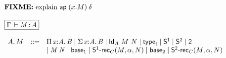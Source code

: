 \begin{small}
\[\begin{array}{l}
\text{\FIXME{explain \apn{}{(x.M)}{\delta}}}

\\ \\

\framebox{\oftp{\Gamma}{M}{A}} \\ \\

\begin{array}{rcl}
A,M & ::= & \picl{x}{A}{B} \mid \sigmacl{x}{A}{B} \mid \idtp{A}{M}{N} \mid
\typ{i} \mid
\dsd{S^1}\mid \dsd{S^2} \mid \dsd{2} \\ 
& & \mid \app M N \mid \base{1} \mid \srec{1}{C}{M}{\alpha}{N} \mid
\base{2} \mid \srec{2}{C}{M}{\alpha}{N} 
\end{array}



\end{array}
\]
\end{small}

